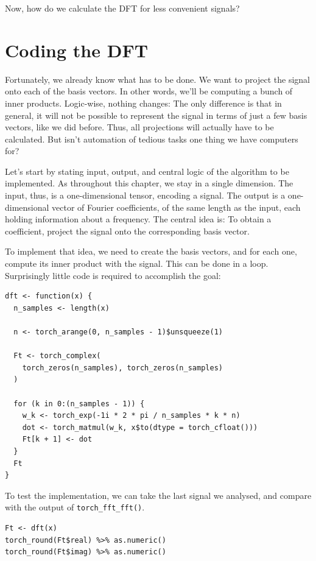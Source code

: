 \documentclass[
  letterpaper,
]{krantz}
\begin{document}
Now, how do we calculate the DFT for less convenient signals?

\hypertarget{coding-the-dft}{%
\section{\texorpdfstring{Coding the
DFT}{Coding the DFT}}\label{coding-the-dft}}

Fortunately, we already know what has to be done. We want to project the
signal onto each of the basis vectors. In other words, we'll be
computing a bunch of inner products. Logic-wise, nothing changes: The
only difference is that in general, it will not be possible to represent
the signal in terms of just a few basis vectors, like we did before.
Thus, all projections will actually have to be calculated. But isn't
automation of tedious tasks one thing we have computers for?

Let's start by stating input, output, and central logic of the algorithm
to be implemented. As throughout this chapter, we stay in a single
dimension. The input, thus, is a one-dimensional tensor, encoding a
signal. The output is a one-dimensional vector of Fourier coefficients,
of the same length as the input, each holding information about a
frequency. The central idea is: To obtain a coefficient, project the
signal onto the corresponding basis vector.

To implement that idea, we need to create the basis vectors, and for
each one, compute its inner product with the signal. This can be done in
a loop. Surprisingly little code is required to accomplish the goal:

\begin{verbatim}
dft <- function(x) {
  n_samples <- length(x)

  n <- torch_arange(0, n_samples - 1)$unsqueeze(1)

  Ft <- torch_complex(
    torch_zeros(n_samples), torch_zeros(n_samples)
  )

  for (k in 0:(n_samples - 1)) {
    w_k <- torch_exp(-1i * 2 * pi / n_samples * k * n)
    dot <- torch_matmul(w_k, x$to(dtype = torch_cfloat()))
    Ft[k + 1] <- dot
  }
  Ft
}
\end{verbatim}

To test the implementation, we can take the last signal we analysed, and
compare with the output of \texttt{torch\_fft\_fft()}.

\begin{verbatim}
Ft <- dft(x)
torch_round(Ft$real) %>% as.numeric()
torch_round(Ft$imag) %>% as.numeric()
\end{verbatim}
\end{document}
